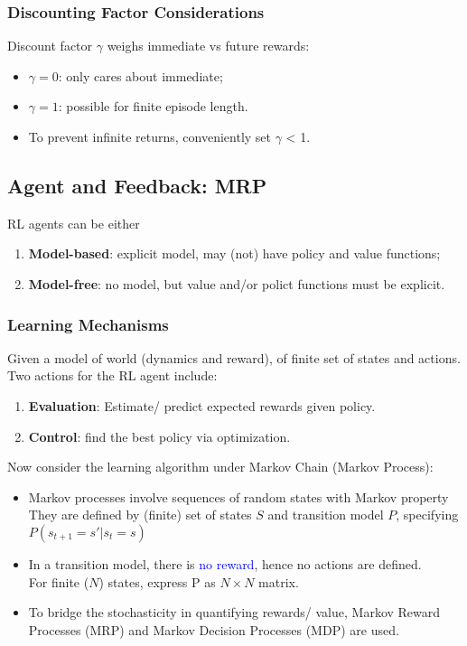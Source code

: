 \documentclass{article}
\begin{document}
\begin{defbox}
  \subsubsection*{Discounting Factor Considerations}
  Discount factor $\gamma$ weighs immediate vs future rewards:
  \begin{itemize}
  \item $\gamma = 0$: only cares about immediate;
  \item $\gamma = 1$: possible for finite episode length.
  \item To prevent infinite returns, conveniently set $\gamma$ < 1.
  \end{itemize}
\end{defbox}

\subsection{Agent and Feedback: MRP}
RL agents can be either
\begin{enumerate}
\item \textbf{Model-based}: explicit model, may (not) have policy and value functions;
\item \textbf{Model-free}: no model, but value and/or polict functions must be explicit.
\end{enumerate}

\begin{defbox}
  \subsubsection*{Learning Mechanisms}
  Given a model of world (dynamics and reward), of finite set of states and actions.
  \\Two actions for the RL agent include:
  \begin{enumerate}
  \item \textbf{Evaluation}: Estimate/ predict expected rewards given policy.
  \item \textbf{Control}: find the best policy via optimization.
  \end{enumerate}
\end{defbox}

Now consider the learning algorithm under Markov Chain (Markov Process):
\begin{itemize}
\item Markov processes involve sequences of random states with Markov property
    \\They are defined by (finite) set of states $S$ and transition model $P$, specifying $P(s_{t+1} = s' | s_t = s)$
\item In a transition model, there is \textcolor{blue}{no reward}, hence no actions are defined.
    \\For finite ($N$) states, express P as $N \times N$ matrix.
\item To bridge the stochasticity in quantifying rewards/ value, 
    Markov Reward Processes (MRP) and Markov Decision Processes (MDP) are used.
\end{itemize}
\end{document}
